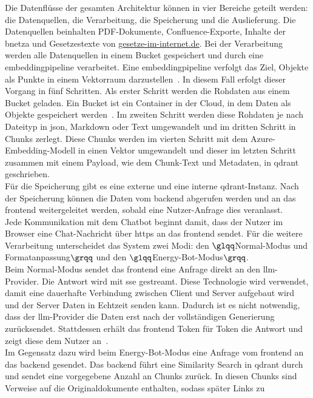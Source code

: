 Die Datenflüsse der gesamten Architektur können in vier Bereiche geteilt werden: die Datenquellen, die Verarbeitung, die Speicherung und die
Auslieferung. Die Datenquellen beinhalten PDF-Dokumente, Confluence-Exporte, Inhalte der \ac{bnetza} und Gesetzestexte von
\url{gesetze-im-internet.de}. 
Bei der Verarbeitung werden alle Datenquellen in einem Bucket gespeichert und durch eine \gls{embeddingpipeline} verarbeitet. Eine \gls{embeddingpipeline} verfolgt das Ziel,
Objekte als Punkte in einem Vektorraum darzustellen~\cite{an20}. In diesem Fall erfolgt dieser Vorgang in fünf Schritten. Als erster Schritt werden die Rohdaten
aus einem Bucket geladen. Ein Bucket ist ein Container in der Cloud, in dem Daten als Objekte gespeichert werden~\cite{an19}. Im zweiten Schritt werden 
diese Rohdaten je nach Dateityp
in \ac{json}, Markdown oder Text umgewandelt und im dritten Schritt in Chunks zerlegt. Diese Chunks werden im vierten Schritt mit dem Azure-Embedding-Modell in einen Vektor umgewandelt und dieser 
im letzten Schritt zusammen mit einem Payload, wie dem Chunk-Text und Metadaten, in \gls{qdrant} geschrieben. \\
Für die Speicherung gibt es eine externe und eine interne \gls{qdrant}-Instanz. Nach der Speicherung können die Daten vom \gls{backend} abgerufen werden und an das 
\gls{frontend} weitergeleitet werden, sobald eine Nutzer-Anfrage dies veranlasst. \\
Jede Kommunikation mit dem Chatbot beginnt damit, dass der Nutzer im Browser eine Chat-Nachricht über \ac{https} an das \gls{frontend} sendet. Für die
weitere Verarbeitung unterscheidet das System zwei Modi: den $\glqq$Normal-Modus und Formatanpassung$\grqq$ und den $\glqq$Energy-Bot-Modus$\grqq$. \\
Beim Normal-Modus sendet das \gls{frontend} eine Anfrage direkt an den \ac{llm}-Provider. Die Antwort wird mit 
\ac{sse} gestreamt. Diese Technologie wird verwendet, damit eine dauerhafte Verbindung zwischen Client und Server aufgebaut wird
und der Server Daten in Echtzeit senden kann. Dadurch ist es nicht notwendig, dass der \ac{llm}-Provider die Daten erst nach der vollständigen Generierung 
zurücksendet. Stattdessen erhält das \gls{frontend} Token für Token die Antwort und zeigt diese dem Nutzer an~\cite{an18}. \\
Im Gegensatz dazu wird beim Energy-Bot-Modus eine Anfrage vom \gls{frontend} an das \gls{backend} gesendet. Das \gls{backend} führt eine Similarity Search
in \gls{qdrant} durch und sendet eine vorgegebene Anzahl an Chunks zurück. In diesen Chunks sind Verweise auf die Originaldokumente enthalten, sodass später Links zu 

